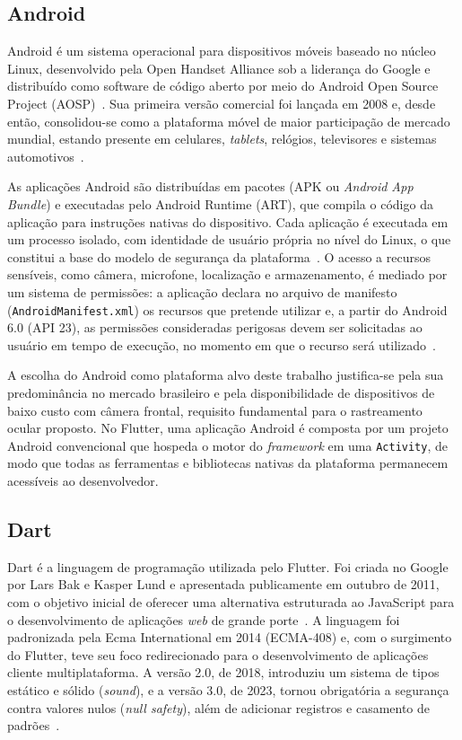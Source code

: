 \subsection{Android} \label{sec:android}

Android é um sistema operacional para dispositivos móveis baseado no núcleo Linux, desenvolvido pela Open Handset Alliance sob a liderança do Google e distribuído como software de código aberto por meio do Android Open Source Project (AOSP)~\cite{android_docs}. Sua primeira versão comercial foi lançada em 2008 e, desde então, consolidou-se como a plataforma móvel de maior participação de mercado mundial, estando presente em celulares, \textit{tablets}, relógios, televisores e sistemas automotivos~\cite{statcounter_mobile_os}.

As aplicações Android são distribuídas em pacotes (APK ou \textit{Android App Bundle}) e executadas pelo Android Runtime (ART), que compila o código da aplicação para instruções nativas do dispositivo. Cada aplicação é executada em um processo isolado, com identidade de usuário própria no nível do Linux, o que constitui a base do modelo de segurança da plataforma~\cite{android_docs}. O acesso a recursos sensíveis, como câmera, microfone, localização e armazenamento, é mediado por um sistema de permissões: a aplicação declara no arquivo de manifesto (\texttt{AndroidManifest.xml}) os recursos que pretende utilizar e, a partir do Android 6.0 (API 23), as permissões consideradas perigosas devem ser solicitadas ao usuário em tempo de execução, no momento em que o recurso será utilizado~\cite{android_permissions}.

A escolha do Android como plataforma alvo deste trabalho justifica-se pela sua predominância no mercado brasileiro e pela disponibilidade de dispositivos de baixo custo com câmera frontal, requisito fundamental para o rastreamento ocular proposto. No Flutter, uma aplicação Android é composta por um projeto Android convencional que hospeda o motor do \textit{framework} em uma \texttt{Activity}, de modo que todas as ferramentas e bibliotecas nativas da plataforma permanecem acessíveis ao desenvolvedor.

\subsection{Dart}

Dart é a linguagem de programação utilizada pelo Flutter. Foi criada no Google por Lars Bak e Kasper Lund e apresentada publicamente em outubro de 2011, com o objetivo inicial de oferecer uma alternativa estruturada ao JavaScript para o desenvolvimento de aplicações \textit{web} de grande porte~\cite{bracha2015dart}. A linguagem foi padronizada pela Ecma International em 2014 (ECMA-408) e, com o surgimento do Flutter, teve seu foco redirecionado para o desenvolvimento de aplicações cliente multiplataforma. A versão 2.0, de 2018, introduziu um sistema de tipos estático e sólido (\textit{sound}), e a versão 3.0, de 2023, tornou obrigatória a segurança contra valores nulos (\textit{null safety}), além de adicionar registros e casamento de padrões~\cite{dart_docs}.

